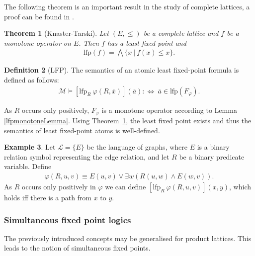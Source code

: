 \documentclass[acmsmall]{acmart}
\theoremstyle{plain}
\newtheorem{theorem}{Theorem}
\theoremstyle{definition}
\newtheorem{definition}[theorem]{Definition}
\newtheorem{example}[theorem]{Example}
\newcommand{\calL}{\mathcal{L}}
\newcommand{\calM}{\mathcal{M}}
\newcommand{\mybar}[1]{\overline{#1}}
\newcommand{\lfp}{\mathrm{lfp}} %
\begin{document}
The following theorem is an important result in the study of complete lattices, a proof can be found in \cite{Arnold2001}. 

\begin{theorem}[Knaster-Tarski]\label{Knaster-Tarski}
Let $(E,\leq)$ be a complete lattice and $f$ be a monotone operator on $E$. Then $f$ has a least fixed point and 
	\begin{align*}
		\lfp(f) = \bigwedge \{x ~|~ f(x) \leq x\}.
	\end{align*} 
\end{theorem}

\begin{definition}[LFP]
	The semantics of an atomic least fixed-point formula is defined as follows:
	\begin{align*}
		\calM \models [\lfp_R ~\varphi(R,\mybar{x})] (\mybar{a}) :\Leftrightarrow~ \mybar{a} \in \lfp(F_{\varphi}).
	\end{align*}
\end{definition}

As $R$ occurs only positively, $F_{\varphi}$ is a monotone operator according to Lemma \ref{lfpmonotoneLemma}.
Using Theorem~\ref{Knaster-Tarski}, the least fixed point exists and thus the semantics
 of least fixed-point atoms is well-defined.

\begin{example}\label{lfpExample}
	Let $\calL = \{E\}$ be the language of graphs, where $E$ is a binary relation symbol
	representing the edge relation, and let $R$ be a binary predicate variable. Define
	\begin{align*}
		\varphi(R,u,v) \equiv E(u,v) \vee \exists w (R(u,w) \wedge E(w,v)).
	\end{align*}
	As $R$ occurs only positively in $\varphi$ we can define $[\lfp_R ~\varphi(R,u,v)] (x,y)$, which holds iff there is a path from $x$ to $y$.
\end{example}


\subsubsection{Simultaneous fixed point logics}



The previously introduced concepts may be generalised for product lattices. This leads to the notion of simultaneous fixed points. %
\end{document}
